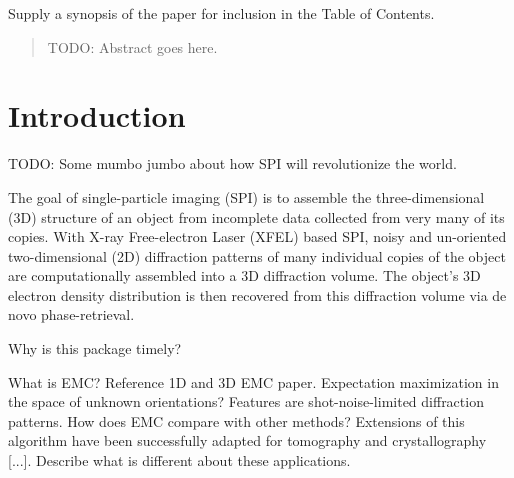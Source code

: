 \documentclass[preprint]{iucr}              %
\begin{document}

\maketitle                        %

\begin{synopsis}
Supply a synopsis of the paper for inclusion in the Table of Contents.
\end{synopsis}

\begin{abstract}
TODO: Abstract goes here.
\end{abstract}



\section{Introduction}

TODO: Some mumbo jumbo about how SPI will revolutionize the world.

The goal of single-particle imaging (SPI) is to assemble the three-dimensional (3D) structure of an object from incomplete data collected from very many of its copies. With X-ray Free-electron Laser (XFEL) based SPI, noisy and un-oriented two-dimensional (2D) diffraction patterns of many individual copies of the object are computationally assembled into a 3D diffraction volume. The object's 3D electron density distribution is then recovered from this diffraction volume via de novo phase-retrieval. 

Why is this package timely?

What is EMC? Reference 1D and 3D EMC paper. Expectation maximization in the space of unknown orientations?
Features are shot-noise-limited diffraction patterns.
How does EMC compare with other methods?
Extensions of this algorithm have been successfully adapted for tomography and crystallography [...]. Describe what is different about these applications. 
\end{document}
